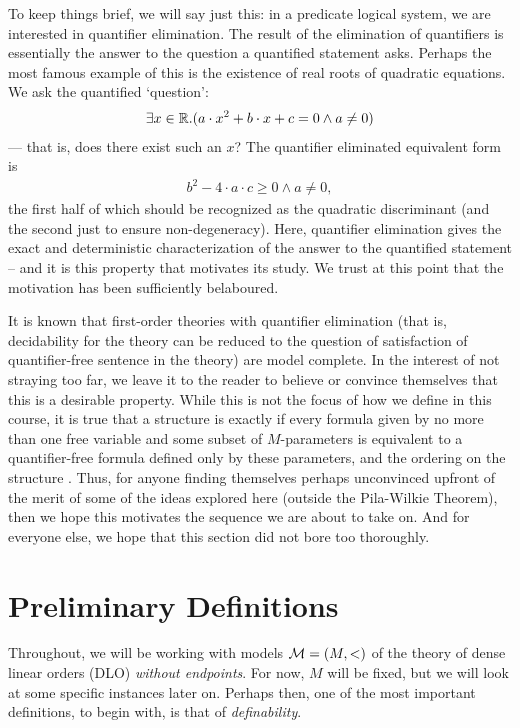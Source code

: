 To keep things brief, we will say just this: in a predicate logical system, we are interested in quantifier elimination. The result of the elimination of quantifiers is essentially the answer to the question a quantified statement asks. Perhaps the most famous example of this is the existence of real roots of quadratic equations. We ask the quantified `question':
\begin{align}
  \exists x \in \mathbb{R} . (a \cdot x^2 + b \cdot x + c = 0 \wedge a \neq 0)
\end{align}
 — that is, does there exist such an $x$? The quantifier eliminated equivalent form is
 \begin{align}
  b^2 - 4 \cdot a \cdot c \geq 0 \wedge a \neq 0,
 \end{align}
 the first half of which should be recognized as the quadratic discriminant (and the second just to ensure non-degeneracy). Here, quantifier elimination gives the exact and deterministic characterization of the answer to the quantified statement -- and it is this property that motivates its study. We trust at this point that the motivation has been sufficiently belaboured.

 It is known that first-order theories with quantifier elimination (that is, decidability for the theory can be reduced to the question of satisfaction of quantifier-free sentence in the theory) are model complete. In the interest of not straying too far, we leave it to the reader to believe or convince themselves that this is a desirable property. While this is not the focus of how we define \omy in this course, it is true that a structure is \om exactly if every formula given by no more than one free variable and some subset of $M$-parameters is equivalent to a quantifier-free formula defined only by these parameters, and the ordering on the structure \cite{marker_model_2002}. Thus, for anyone finding themselves perhaps unconvinced upfront of the merit of some of the ideas explored here (outside the Pila-Wilkie Theorem), then we hope this motivates the sequence we are about to take on. And for everyone else, we hope that this section did not bore too thoroughly.


\section{Preliminary Definitions}
\label{sec:prelim-defns}
Throughout, we will be working with models $ \mathcal{M} = (M, <)$ of the theory of dense linear orders (DLO) \emph{without endpoints}. For now, $M$ will be fixed, but we will look at some specific instances later on. Perhaps then, one of the most important definitions, to begin with, is that of \emph{definability}.

